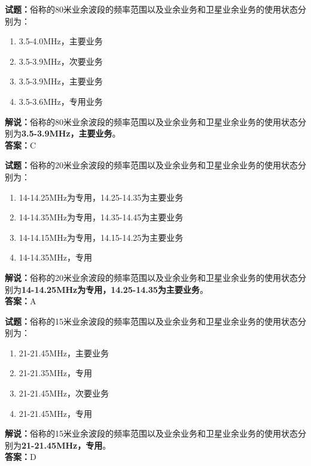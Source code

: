 \documentclass{ctexbook}
\begin{document}
\bigskip


\noindent\textbf{试题：}俗称的80米业余波段的频率范围以及业余业务和卫星业余业务的使用状态分别为：
\begin{enumerate}[leftmargin=3em]
\item 3.5-4.0\unit{\MHz}，主要业务
\item 3.5-3.9\unit{\MHz}，次要业务
\item 3.5-3.9\unit{\MHz}，主要业务
\item 3.5-3.6\unit{\MHz}，专用业务
\end{enumerate}
\noindent\textbf{解说：}俗称的80米业余波段的频率范围以及业余业务和卫星业余业务的使用状态分别为\textbf{3.5-3.9\unit{\MHz}，主要业务}。\\\noindent\textbf{答案：}C



\bigskip


\noindent\textbf{试题：}俗称的20米业余波段的频率范围以及业余业务和卫星业余业务的使用状态分别为：
\begin{enumerate}[leftmargin=3em]
\item 14-14.25\unit{\MHz}为专用，14.25-14.35为主要业务
\item 14-14.35\unit{\MHz}为专用，14.35-14.45为主要业务
\item 14-14.15\unit{\MHz}为专用，14.15-14.25为主要业务
\item 14-14.35\unit{\MHz}，专用
\end{enumerate}
\noindent\textbf{解说：}俗称的20米业余波段的频率范围以及业余业务和卫星业余业务的使用状态分别为\textbf{14-14.25\unit{\MHz}为专用，14.25-14.35为主要业务}。\\\noindent\textbf{答案：}A



\bigskip


\noindent\textbf{试题：}俗称的15米业余波段的频率范围以及业余业务和卫星业余业务的使用状态分别为：
\begin{enumerate}[leftmargin=3em]
\item 21-21.45\unit{\MHz}，主要业务
\item 21-21.35\unit{\MHz}，专用
\item 21-21.45\unit{\MHz}，次要业务
\item 21-21.45\unit{\MHz}，专用
\end{enumerate}
\noindent\textbf{解说：}俗称的15米业余波段的频率范围以及业余业务和卫星业余业务的使用状态分别为\textbf{21-21.45\unit{\MHz}，专用}。\\\noindent\textbf{答案：}D
\end{document}
